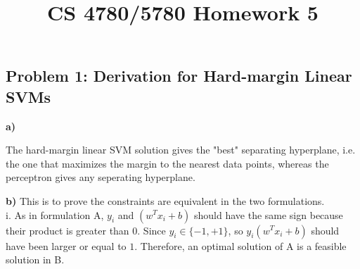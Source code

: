 \documentclass[a4paper]{article}
\title{CS 4780/5780 Homework 5\vspace{-10pt}}
\date{\vspace{-0pt}}
\begin{document}
\maketitle

\subsection*{Problem 1: Derivation for Hard-margin Linear SVMs}
\textbf{a)} 

The hard-margin linear SVM solution gives the "best" separating hyperplane, i.e. the one that maximizes the margin to the nearest data points, whereas the perceptron gives any seperating hyperplane.

\textbf{b)}
This is to prove the constraints are equivalent in the two formulations.\\
i. As in formulation A, $y_{i}$ and $(w^Tx_i+b)$ should have the same sign because their product is greater than $0$. Since $y_i \in \{-1,+1\}$, so $y_{i}(w^Tx_i+b)$ should have been larger or equal to $1$. Therefore, an optimal solution of A is a feasible solution in B.
\end{document}
